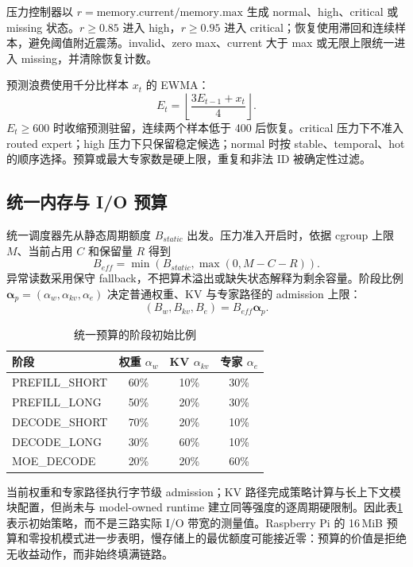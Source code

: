 压力控制器以 $r=\mathrm{memory.current}/\mathrm{memory.max}$ 生成 normal、high、critical 或 missing 状态。$r\ge 0.85$ 进入 high，$r\ge 0.95$ 进入 critical；恢复使用滞回和连续样本，避免阈值附近震荡。invalid、zero max、current 大于 max 或无限上限统一进入 missing，并清除恢复计数。

预测浪费使用千分比样本 $x_t$ 的 EWMA：
\begin{equation}
  E_t=\left\lfloor\frac{3E_{t-1}+x_t}{4}\right\rfloor.
\end{equation}
$E_t\ge 600$ 时收缩预测驻留，连续两个样本低于 400 后恢复。critical 压力下不准入 routed expert；high 压力下只保留稳定候选；normal 时按 stable、temporal、hot 的顺序选择。预算或最大专家数是硬上限，重复和非法 ID 被确定性过滤。

\subsection{统一内存与 I/O 预算}

统一调度器先从静态周期额度 $B_{static}$ 出发。压力准入开启时，依据 cgroup 上限 $M$、当前占用 $C$ 和保留量 $R$ 得到
\begin{equation}
  B_{eff}=\min(B_{static},\max(0,M-C-R)).
\end{equation}
异常读数采用保守 fallback，不把算术溢出或缺失状态解释为剩余容量。阶段比例 $\boldsymbol{\alpha}_p=(\alpha_w,\alpha_{kv},\alpha_e)$ 决定普通权重、KV 与专家路径的 admission 上限：
\begin{equation}
  (B_w,B_{kv},B_e)=B_{eff}\boldsymbol{\alpha}_p.
\end{equation}

\begin{table}[H]
  \centering
  \caption{统一预算的阶段初始比例}
  \label{tab:budget-ratios-finals}
  \begin{tabular}{lccc}
    \toprule
    阶段 & 权重 $\alpha_w$ & KV $\alpha_{kv}$ & 专家 $\alpha_e$ \\
    \midrule
    PREFILL\_SHORT & 60\% & 10\% & 30\% \\
    PREFILL\_LONG  & 50\% & 20\% & 30\% \\
    DECODE\_SHORT  & 70\% & 20\% & 10\% \\
    DECODE\_LONG   & 30\% & 60\% & 10\% \\
    MOE\_DECODE    & 20\% & 20\% & 60\% \\
    \bottomrule
  \end{tabular}
\end{table}

当前权重和专家路径执行字节级 admission；KV 路径完成策略计算与长上下文模块配置，但尚未与 model-owned runtime 建立同等强度的逐周期硬限制。因此表\ref{tab:budget-ratios-finals}表示初始策略，而不是三路实际 I/O 带宽的测量值。Raspberry Pi 的 16\,MiB 预算和零投机模式进一步表明，慢存储上的最优额度可能接近零：预算的价值是拒绝无收益动作，而非始终填满链路。

